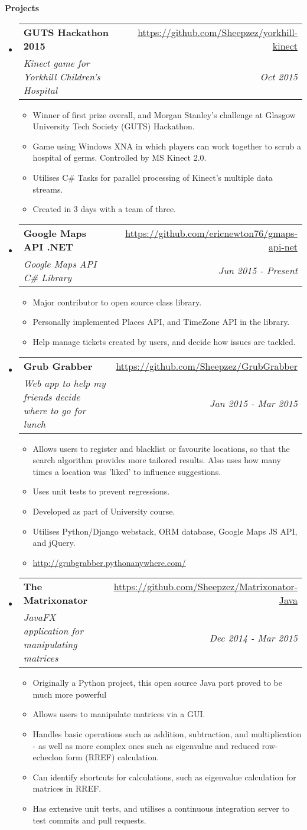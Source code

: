 \documentclass[letterpaper,11pt]{article}
\makeatletter
\newcommand{\resitem}[1]{\item #1 \vspace{-2pt}}
\newcommand{\resheading}[1]{{\large \colorbox{mygrey}{\begin{minipage}{\textwidth}{\textbf{#1 \vphantom{p\^{E}}}}\end{minipage}}}}
\newcommand{\ressubheading}[4]{
\begin{tabular*}{7.0in}{l@{\extracolsep{\fill}}r}
	\textbf{#1} & #2 \\
	\textit{#3} & \textit{#4} \\
\end{tabular*}\vspace{-6pt}}
\makeatother
\begin{document}
	\pagebreak

	\resheading{Projects}
	\begin{itemize}
		\item
		\ressubheading{GUTS Hackathon 2015}{\url{https://github.com/Sheepzez/yorkhill-kinect}}
		{Kinect game for Yorkhill Children's Hospital}{Oct 2015}
		\begin{itemize}
			\resitem{Winner of first prize overall, and Morgan Stanley's challenge at Glasgow University Tech Society (GUTS) Hackathon.}
			\resitem{Game using Windows XNA in which players can work together to scrub a hospital of germs. Controlled by MS Kinect 2.0.}
			\resitem{Utilises C\# Tasks for parallel processing of Kinect's multiple data streams.}
			\resitem{Created in 3 days with a team of three.}
		\end{itemize}

		\item
		\ressubheading{Google Maps API .NET}{\url{https://github.com/ericnewton76/gmaps-api-net}}
		{Google Maps API C\# Library}{Jun 2015 - Present}
		\begin{itemize}
			\resitem{Major contributor to open source class library.}
			\resitem{Personally implemented Places API, and TimeZone API in the library.}
			\resitem{Help manage tickets created by users, and decide how issues are tackled.}
		\end{itemize}

		\item
		\ressubheading{Grub Grabber}{\url{https://github.com/Sheepzez/GrubGrabber}}
		{Web app to help my friends decide where to go for lunch}{Jan 2015 - Mar 2015}
		\begin{itemize}
			\resitem{Allows users to register and blacklist or favourite locations, so that the search algorithm provides more tailored results. Also uses how many times a location was 'liked' to influence suggestions.}
			\resitem{Uses unit tests to prevent regressions.}
			\resitem{Developed as part of University course.}
			\resitem{Utilises Python/Django webstack, ORM database, Google Maps JS API, and jQuery.}
			\resitem{\url{http://grubgrabber.pythonanywhere.com/}}
		\end{itemize}

		\item
		\ressubheading{The Matrixonator}{\url{https://github.com/Sheepzez/Matrixonator-Java}}
		{JavaFX application for manipulating matrices}{Dec 2014 - Mar 2015}
		\begin{itemize}
			\resitem{Originally a Python project, this open source Java port proved to be much more powerful}
			\resitem{Allows users to manipulate matrices via a GUI.}
			\resitem{Handles basic operations such as addition, subtraction, and multiplication - as well as
			more complex ones such as eigenvalue and reduced row-echeclon form (RREF) calculation.}
			\resitem{Can identify shortcuts for calculations, such as eigenvalue calculation for matrices in RREF.}
			\resitem{Has extensive unit tests, and utilises a continuous integration server to test commits and pull requests.}
		\end{itemize}

	\end{itemize}
\end{document}
